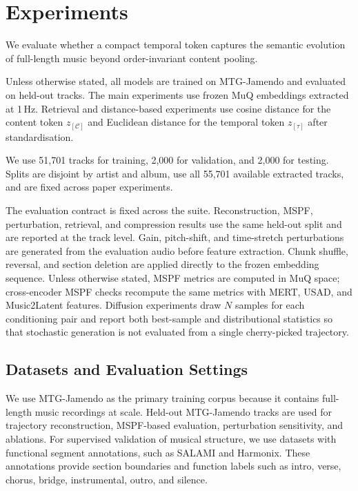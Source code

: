 \documentclass{article}
\newcommand{\zC}{z_{[\mathcal{C}]}}    %
\newcommand{\ztau}{z_{[\tau]}}          %
\begin{document}
\section{Experiments}
\label{sec:experiments}

We evaluate whether a compact temporal token captures the semantic
evolution of full-length music beyond order-invariant content
pooling.

Unless otherwise stated, all models are trained on MTG-Jamendo and
evaluated on held-out tracks.  The main experiments use frozen MuQ
embeddings extracted at 1\,Hz.  Retrieval and distance-based
experiments use cosine distance for the content token $\zC$ and
Euclidean distance for the temporal token $\ztau$ after
standardisation.

We use 51,701 tracks for training, 2,000 for validation, and 2,000
for testing.  Splits are disjoint by artist and album, use all 55,701
available extracted tracks, and are fixed across paper experiments.

The evaluation contract is fixed across the suite.  Reconstruction,
MSPF, perturbation, retrieval, and compression results use the same
held-out split and are reported at the track level.  Gain, pitch-shift,
and time-stretch perturbations are generated from the evaluation audio
before feature extraction.  Chunk shuffle, reversal, and section
deletion are applied directly to the frozen embedding sequence.  Unless
otherwise stated, MSPF metrics are
computed in MuQ space; cross-encoder MSPF checks recompute the same
metrics with MERT, USAD, and Music2Latent features.  Diffusion
experiments draw $N$ samples for each conditioning pair and report
both best-sample and distributional statistics so that stochastic
generation is not evaluated from a single cherry-picked trajectory.

\subsection{Datasets and Evaluation Settings}
\label{ssec:exp_setup}

We use MTG-Jamendo as the primary training corpus because it
contains full-length music recordings at scale.  Held-out
MTG-Jamendo tracks are used for trajectory reconstruction,
MSPF-based evaluation, perturbation sensitivity, and ablations.
For supervised validation of musical structure, we use datasets
with functional segment annotations, such as SALAMI and Harmonix.
These annotations provide section boundaries and function labels
such as intro, verse, chorus, bridge, instrumental, outro, and
silence.
\end{document}
